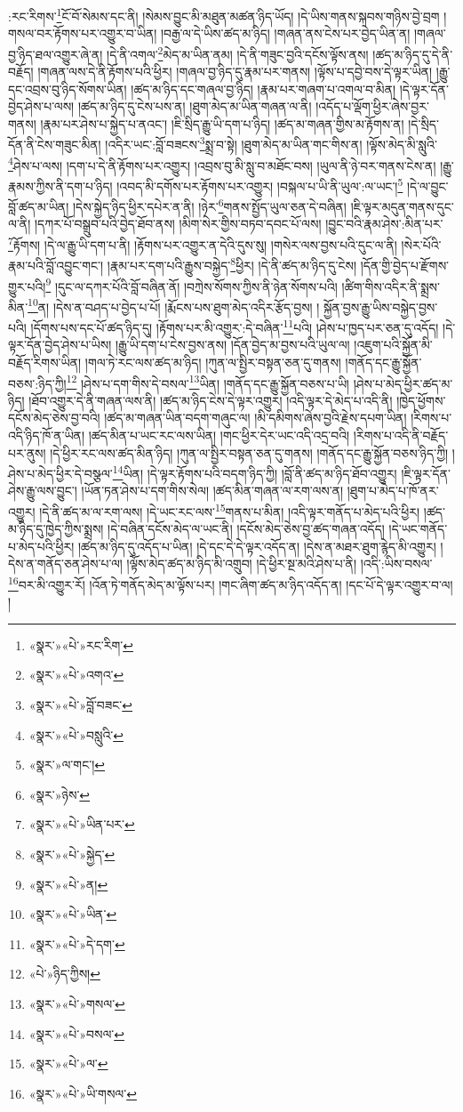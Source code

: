 :རང་རིགས་\footnote{«སྣར་»«པེ་»རང་རིག་}ངོ་བོ་སེམས་དང་ནི། །སེམས་བྱུང་མི་མཐུན་མཚན་ཉིད་ཡོད། །དེ་ཡིས་གནས་སྐབས་གཉིས་བྱེ་བྲག །གསལ་བར་རྟོགས་པར་འགྱུར་བ་ཡིན། །བརྒྱ་ལ་དེ་ཡིས་ཚད་མ་ཉིད། །གཞན་ནས་ངེས་པར་བྱེད་ཡིན་ན། །གཞལ་བྱ་ཉིད་ཐལ་འགྱུར་ཞེ་ན། །དེ་ནི་འགལ་\footnote{«སྣར་»«པེ་»འགའ་}མེད་མ་ཡིན་ནམ། །དེ་ནི་གཟུང་བྱའི་དངོས་ལྟོས་ནས། །ཚད་མ་ཉིད་དུ་དེ་ནི་བརྗོད། །གཞན་ལས་དེ་ནི་རྟོགས་པའི་ཕྱིར། །གཞལ་བྱ་ཉིད་དུ་རྣམ་པར་གནས། །ལྟོས་པ་དབྱེ་བས་དེ་ལྟར་ཡིན། །རྒྱུ་དང་འབྲས་བུ་ཉིད་སོགས་ཡིན། །ཚད་མ་ཉིད་དང་གཞལ་བྱ་ཉིད། །རྣམ་པར་གཞག་པ་འགལ་བ་མིན། །དེ་ལྟར་དོན་བྱེད་ཤེས་པ་ལས། །ཚད་མ་ཉིད་དུ་ངེས་པས་ན། །ཐུག་མེད་མ་ཡིན་གཞན་ལ་ནི། །འདོད་པ་ལྡོག་ཕྱིར་ཞེས་བྱར་གནས། །རྣམ་པར་ཤེས་པ་སྐྱེད་པ་ནའང་། །ཇི་སྲིད་རྒྱུ་ཡི་དག་པ་ཉིད། །ཚད་མ་གཞན་གྱིས་མ་རྟོགས་ན། །དེ་སྲིད་དོན་ནི་ངེས་གཟུང་མིན། །འདིར་ཡང་:བློ་བཟངས་\footnote{«སྣར་»«པེ་»བློ་བཟང་}སྨྲ་བ་སྟེ། །ཐུག་མེད་མ་ཡིན་གང་གིས་ན། །ལྟོས་མེད་མི་སླུའི་\footnote{«སྣར་»«པེ་»བསླུའི་}ཤེས་པ་ལས། །དག་པ་དེ་ནི་རྟོགས་པར་འགྱུར། །འབྲས་བུ་མི་སླུ་བ་མཐོང་བས། །ཡུལ་ནི་ཉེ་བར་གནས་ངེས་ན། །རྒྱུ་རྣམས་ཀྱིས་ནི་དག་པ་ཉིད། །འབད་མི་དགོས་པར་རྟོགས་པར་འགྱུར། །བསྐལ་པ་ཡི་ནི་ཡུལ་:ལ་ཡང་།\footnote{«སྣར་»ལ་གང་།} །དེ་ལ་བྱུང་བློ་ཚད་མ་ཡིན། །དེས་སྐྱེད་ཉིད་ཕྱིར་དཔེར་ན་ནི། །ཉེར་\footnote{«སྣར་»ཉེས་}གནས་སྤྱོད་ཡུལ་ཅན་དེ་བཞིན། །ཇི་ལྟར་མདུན་གནས་དུང་ལ་ནི། །དཀར་པོ་བསྒྲུབ་པའི་བྱེད་ཐོབ་ནས། །མིག་སེར་གྱིས་བཏབ་དབང་པོ་ལས། །བྱུང་བའི་རྣམ་ཤེས་:མིན་པར་\footnote{«སྣར་»«པེ་»ཡིན་པར་}རྟོགས། །དེ་ལ་རྒྱུ་ཡི་དག་པ་ནི། །རྟོགས་པར་འགྱུར་ན་དེའི་དུས་སུ། །གསེར་ལས་བྱས་པའི་དུང་ལ་ནི། །སེར་པོའི་རྣམ་པའི་བློ་འབྱུང་གང་། །རྣམ་པར་དག་པའི་རྒྱུས་བསྐྱེད་\footnote{«སྣར་»«པེ་»སྐྱེད་}ཕྱིར། །དེ་ནི་ཚད་མ་ཉིད་དུ་ངེས། །དོན་གྱི་བྱེད་པ་རྫོགས་གྱུར་པའི།\footnote{«སྣར་»«པེ་»ན།} །དུང་ལ་དཀར་པོའི་བློ་བཞིན་ནོ། །བཀྲེས་སོགས་ཀྱིས་ནི་ཉེན་སོགས་པའི། །ཚིག་གིས་འདིར་ནི་སྨྲས་མིན་\footnote{«སྣར་»«པེ་»ཡིན་}ན། །དེས་ན་བཤད་པ་བྱེད་པ་པོ། །རྨོངས་པས་ཐུག་མེད་འདིར་རྩོད་བྱས། །
སྐྱོན་བྱས་རྒྱུ་ཡིས་བསྐྱེད་བྱས་པའི། །དོགས་པས་དང་པོ་ཚད་ཉིད་དུ། །རྟོགས་པར་མི་འགྱུར་:དེ་བཞིན་\footnote{«སྣར་»«པེ་»དེ་དག་}པའི། །ཤེས་པ་ཁྱད་པར་ཅན་དུ་འདོད། །དེ་ལྟར་དོན་བྱེད་ཤེས་པ་ཡིས། །རྒྱུ་ཡི་དག་པ་ངེས་བྱས་ནས། །དོན་བྱེད་མ་བྱས་པའི་ཡུལ་ལ། །འཇུག་པའི་སྐྱོན་མི་བརྗོད་རིགས་ཡིན། །གལ་ཏེ་རང་ལས་ཚད་མ་ཉིད། །ཀུན་ལ་སྤྱིར་བསྟན་ཅན་དུ་གནས། །གནོད་དང་རྒྱུ་སྐྱོན་བཅས་:ཉིད་ཀྱི།\footnote{«པེ་»ཉིད་ཀྱིས།} །ཤེས་པ་དག་གིས་དེ་བསལ་\footnote{«སྣར་»«པེ་»གསལ་}ཡིན། །གནོད་དང་རྒྱུ་སྐྱོན་བཅས་པ་ཡི། །ཤེས་པ་མེད་ཕྱིར་ཚད་མ་ཉིད། །ཐོབ་འགྱུར་དེ་ནི་གཞན་ལས་ནི། །ཚད་མ་ཉིད་ངེས་དེ་ལྟར་འགྱུར། །འདི་ལྟར་དེ་མེད་པ་འདི་ནི། །ཁྱེད་ཕྱོགས་དངོས་མེད་ཅེས་བྱ་བའི། །ཚད་མ་གཞན་ཡིན་བདག་གཞུང་ལ། །མི་དམིགས་ཞེས་བྱའི་རྗེས་དཔག་ཡིན། །རིགས་པ་འདི་ཉིད་ཁོ་ན་ཡིན། །ཚད་མིན་པ་ཡང་རང་ལས་ཡིན། །གང་ཕྱིར་དེར་ཡང་འདི་འདྲ་བའི། །རིགས་པ་འདི་ནི་བརྗོད་པར་ནུས། །དེ་ཕྱིར་རང་ལས་ཚད་མིན་ཉིད། །ཀུན་ལ་སྤྱིར་བསྟན་ཅན་དུ་གནས། །གནོད་དང་རྒྱུ་སྐྱོན་བཅས་ཉིད་ཀྱི། །ཤེས་པ་མེད་ཕྱིར་དེ་བསྩལ་\footnote{«སྣར་»«པེ་»བསལ་}ཡིན། །དེ་ལྟར་རྟོགས་པའི་བདག་ཉིད་ཀྱི། །བློ་ནི་ཚད་མ་ཉིད་ཐོབ་འགྱུར། །ཇི་ལྟར་དོན་ཤེས་རྒྱུ་ལས་བྱུང་། །ཡོན་ཏན་ཤེས་པ་དག་གིས་སེལ། །ཚད་མིན་གཞན་ལ་རག་ལས་ན། །ཐུག་པ་མེད་པ་ཁོ་ནར་འགྱུར། །དེ་ནི་ཚད་མ་ལ་རག་ལས། །དེ་ཡང་རང་ལས་\footnote{«སྣར་»«པེ་»ལ་}གནས་པ་མིན། །འདི་ལྟར་གནོད་པ་མེད་པའི་ཕྱིར། །ཚད་མ་ཉིད་དུ་ཁྱེད་ཀྱིས་སྨྲས། །དེ་བཞིན་དངོས་མེད་ལ་ཡང་ནི། །དངོས་མེད་ཅེས་བྱ་ཚད་གཞན་འདོད། །དེ་ཡང་གནོད་པ་མེད་པའི་ཕྱིར། །ཚད་མ་ཉིད་དུ་འདོད་པ་ཡིན། །དེ་དང་དེ་དེ་ལྟར་འདོད་ན། །དེས་ན་མཐར་ཐུག་རྙེད་མི་འགྱུར། །དེས་ན་གནོད་ཅན་ཤེས་པ་ལ། །ལྟོས་མེད་ཚད་མ་ཉིད་མི་འགྲུབ། །དེ་ཕྱིར་སྔ་མའི་ཤེས་པ་ནི། །འདི་:ཡིས་བསལ་\footnote{«སྣར་»«པེ་»ཡི་གསལ་}བར་མི་འགྱུར་རོ། །འོན་ཏེ་གནོད་མེད་མ་ལྟོས་པར། །གང་ཞིག་ཚད་མ་ཉིད་འདོད་ན། །དང་པོ་དེ་ལྟར་འགྱུར་བ་ལ། །
